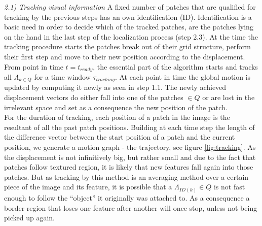 %
\textit{2.1) Tracking visual information} \newline%
A fixed number of patches that are qualified for tracking by the previous steps has an own identification (ID). Identification is a basic need in order to decide which of the tracked patches, are the patches lying on the hand in the last step of the localization process (step 2.3). At the time the tracking procedure starts the patches break out of their grid structure, perform their first step and move to their new position according to the displacement. From point in time $t=t_{ready}$, the essential part of the algorithm starts and tracks all $\Lambda_{k \in Q} $ for a time window $\tau_{tracking}$. At each point in time the global motion is updated by computing it newly as seen in step 1.1. The newly achieved displacement vectors do either fall into one of the patches $\in Q$ or are lost in the irrelevant space and set as a consequence the new position of the patch. \\
For the duration of tracking, each position of a patch in the image is the resultant of all the past patch positions. Building at each time step the length of the difference vector between the start position of a patch and the current position, we generate a motion graph - the trajectory, see figure \ref{fig:tracking}. %
As the displacement is not infinitively big, but rather small and due to the fact that patches follow textured region, it is likely that new features fall again into those patches. But as tracking by this method is an averaging method over a certain piece of the image and its feature, it is possible that a $\Lambda_{ID\left( k \right) } \in Q$ is not fast enough to follow the ``object'' it originally was attached to. As a consequence a border region that loses one feature after another will once stop, unless not being picked up again. \\ \\ \\ \\ \\ 

